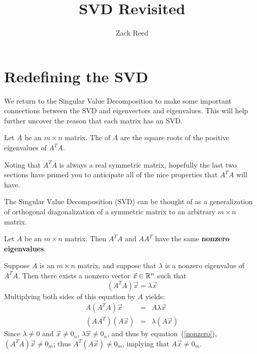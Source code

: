 \documentclass{ximera}
\author{Zack Reed}
\title{SVD Revisited}
\begin{document}
\begin{abstract}

\end{abstract}
\maketitle

\section*{Redefining the SVD}
We return to the Singular Value Decomposition to make some important connections between the SVD and eigenvectors and eigenvalues. This will help further uncover the reason that each matrix has an SVD.
 
\begin{definition}\label{singularvalues}
Let $A$ be an $m\times n$ matrix. The  of $A$ are the square roots of the positive
eigenvalues of $A^TA.$
\end{definition}
 
Noting that $A^TA$ is always a real symmetric matrix, hopefully the last two sections have primed you to anticipate all of the nice properties that $A^TA$ will have.

The Singular Value Decomposition (SVD) can be thought of as
a generalization of orthogonal diagonalization of a symmetric matrix
to an arbitrary $m\times n$ matrix.
 
\begin{lemma}\label{lem:samenonzeroeigenvalues}
Let $A$ be an $m \times n$ matrix. Then $A^TA$ and $AA^T$ have the same \textbf{nonzero eigenvalues}.
\end{lemma}
 
Suppose $A$ is an $m\times n$ matrix, and suppose that  $\lambda$ is a nonzero eigenvalue of $A^TA$.
Then there exists a nonzero vector $\vec{x} \in \mathbb{R}^n$ such that
\begin{equation}\label{nonzero}
(A^TA)\vec{x}=\lambda \vec{x}
\end{equation}
Multiplying both sides of this equation by $A$ yields:
\begin{eqnarray*}
A(A^TA)\vec{x} & = & A\lambda \vec{x}\\
(AA^T)(A\vec{x}) & = & \lambda (A\vec{x})
\end{eqnarray*}
Since $\lambda\neq 0$ and $\vec{x}\neq 0_n$, $\lambda \vec{x}\neq 0_n$,
and thus by equation~(\ref{nonzero}),
$(A^TA)\vec{x}\neq 0_m$; thus $A^T(A\vec{x})\neq 0_m$,
implying that $A\vec{x}\neq 0_m$.
 
\end{document}
